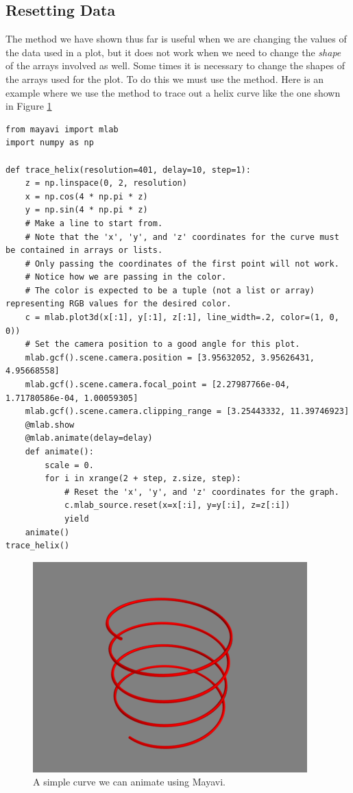 \subsection*{Resetting Data}
The  method we have shown thus far is useful when we are changing the values of the data used in a plot, but it does not work when we need to change the \emph{shape} of the arrays involved as well.
Some times it is necessary to change the shapes of the arrays used for the plot.
To do this we must use the  method.
Here is an example where we use the  method to trace out a helix curve like the one shown in Figure \ref{fig:helix_animation}
\begin{lstlisting}
from mayavi import mlab
import numpy as np

def trace_helix(resolution=401, delay=10, step=1):
    z = np.linspace(0, 2, resolution)
    x = np.cos(4 * np.pi * z)
    y = np.sin(4 * np.pi * z)
    # Make a line to start from.
    # Note that the 'x', 'y', and 'z' coordinates for the curve must be contained in arrays or lists.
    # Only passing the coordinates of the first point will not work.
    # Notice how we are passing in the color.
    # The color is expected to be a tuple (not a list or array) representing RGB values for the desired color.
    c = mlab.plot3d(x[:1], y[:1], z[:1], line_width=.2, color=(1, 0, 0))
    # Set the camera position to a good angle for this plot.
    mlab.gcf().scene.camera.position = [3.95632052, 3.95626431, 4.95668558]
    mlab.gcf().scene.camera.focal_point = [2.27987766e-04, 1.71780586e-04, 1.00059305]
    mlab.gcf().scene.camera.clipping_range = [3.25443332, 11.39746923]
    @mlab.show
    @mlab.animate(delay=delay)
    def animate():
        scale = 0.
        for i in xrange(2 + step, z.size, step):
            # Reset the 'x', 'y', and 'z' coordinates for the graph.
            c.mlab_source.reset(x=x[:i], y=y[:i], z=z[:i])
            yield
    animate()
trace_helix()
\end{lstlisting}

\begin{figure}
\includegraphics[width=\textwidth]{helix.png}
\caption{A simple curve we can animate using Mayavi.}
\label{fig:helix_animation}
\end{figure}

